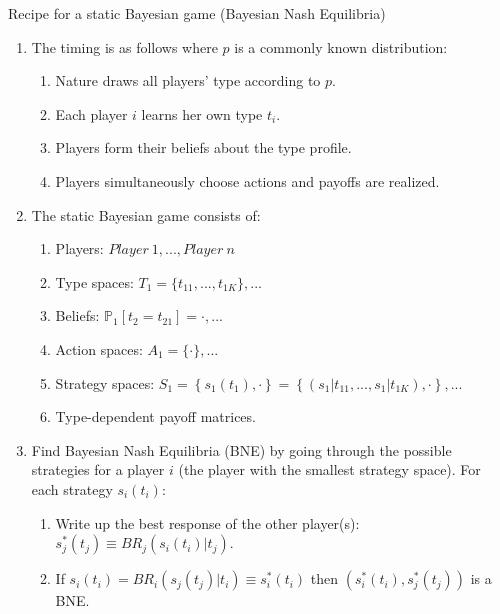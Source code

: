 \begin{frame}{Recipe for a static Bayesian game (Bayesian Nash Equilibria)}
    \begin{enumerate}
      \item The timing is as follows where $p$ is a commonly known distribution:
      \begin{enumerate}\normalsize
        \item Nature draws all players' type according to $p$.
        \item Each player $i$ learns her own type $t_{i}$.
        \item Players form their beliefs about the type profile.
        \item Players simultaneously choose actions and payoffs are realized.
      \end{enumerate}
      \item The static Bayesian game consists of:
      \begin{enumerate}\normalsize
        \item Players: $Player\ 1,...,Player\ n$
        \item Type spaces: $T_1=\{t_{11},...,t_{1K}\},...$
        \item Beliefs: $\mathbb{P}_1[t_2=t_{21}]=\cdot,...$
        \item Action spaces: $A_1=\{\cdot\},...$
        \item Strategy spaces: $S_1=\left\{s_1(t_1),\cdot\right\}=\left\{(s_1|t_{11},...,s_1|t_{1K}),\cdot\right\},...$
        \item Type-dependent payoff matrices.
      \end{enumerate}
      \item Find Bayesian Nash Equilibria (BNE) by going through the possible strategies for a player $i$ (the player with the smallest strategy space). For each strategy $s_i(t_i)$:
      \begin{enumerate}\normalsize
        \item Write up the best response of the other player(s): $s_j^*(t_j)\equiv BR_j\left(s_i(t_i)|t_j\right)$.
        \item If $s_i(t_i)=BR_i\left(s_j(t_j)|t_i\right)\equiv s_i^*(t_i)$ then $\left(s_i^*(t_i),s_j^*(t_j)\right)$ is a BNE.
      \end{enumerate}
    \end{enumerate}
    \vfill\null
\end{frame}
